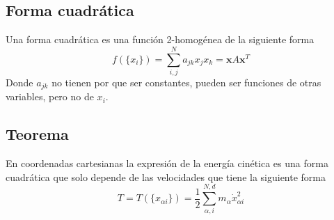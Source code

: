 \subsection{Forma cuadrática}
Una forma cuadrática es una función 2-homogénea de la siguiente forma
\begin{equation} \label{2.4.3}
    f(\{x_i\})=\sum_{i,j}^N{{a_{jk} x_j x_k}}=\mathbf{x} A \mathbf{x}^T
\end{equation} 
Donde $a_{jk}$ no tienen por que ser constantes, pueden ser funciones de otras variables, pero no de $x_i$.
\subsection{Teorema}
En coordenadas cartesianas la expresión de la energía cinética es una forma cuadrática que solo depende de las velocidades que tiene la siguiente forma
\begin{equation} \label{2.4.4}
    T=T(\{x_{\alpha i}\})=\frac{1}{2} \sum_{\alpha, i}^{N,d} m_\alpha \dot{x}_{\alpha i}^2
\end{equation} 
\vspace{-25pt}

